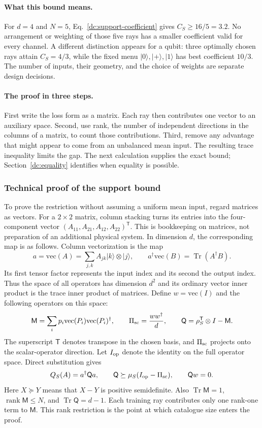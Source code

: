 \documentclass[11pt,a4paper]{article}
\newcommand{\ket}[1]{\lvert #1\rangle}
\newcommand{\Tr}{\operatorname{Tr}}
\numberwithin{equation}{section}
\begin{document}
\paragraph{What this bound means.}
For $d=4$ and $N=5$, Eq.~\eqref{dc:support-coefficient} gives $C_S\ge16/5=3.2$.
No arrangement or weighting of those five rays has a smaller coefficient
valid for every channel. A different distinction appears for a qubit:
three optimally chosen rays attain $C_S=4/3$, while the fixed menu
$\ket0,\ket+,\ket1$ has best coefficient $10/3$. The number of inputs,
their geometry, and the choice of weights are separate design decisions.

\paragraph{The proof in three steps.}
First write the loss form as a matrix. Each ray then contributes one vector
to an auxiliary space. Second, use rank, the number of independent directions
in the columns of a matrix, to count those contributions. Third, remove any
advantage that might appear to come from an unbalanced mean input. The
resulting trace inequality limits the gap. The next calculation supplies
the exact bound; Section~\ref{dc:equality} identifies when equality is possible.

\subsubsection*{Technical proof of the support bound}
To prove the restriction without assuming a uniform mean input, regard
matrices as vectors. For a $2\times2$ matrix, column stacking turns its
entries into the four-component vector
$(A_{11},A_{21},A_{12},A_{22})^{\mathsf T}$. This is bookkeeping on matrices,
not preparation of an additional physical system. In dimension $d$, the
corresponding map is as follows.  Column vectorization is the map
\[
 a=\mathrm{vec}(A)=\sum_{j,k}A_{jk}\ket{k}\otimes\ket{j},
 \qquad a^\dagger\mathrm{vec}(B)=\Tr(A^\dagger B).
\]
Its first tensor factor represents the input index and its second the output
index.  Thus the space of all operators has dimension $d^2$ and its ordinary
vector inner product is the trace inner product of matrices.  Define
$w=\mathrm{vec}(I)$ and the following operators on this space:
\[
 \mathsf M=\sum_i p_i\mathrm{vec}(P_i)\mathrm{vec}(P_i)^\dagger,
 \qquad
 \Pi_{\rm sc}=\frac{ww^\dagger}{d},
 \qquad
 \mathsf Q=\rho_S^{\mathsf T}\otimes I-\mathsf M.
\]
The superscript $\mathsf T$ denotes transpose in the chosen basis, and
$\Pi_{\rm sc}$ projects onto the scalar-operator direction.  Let $I_{\rm op}$
denote the identity on the full operator space.  Direct substitution gives
\begin{equation}
 Q_S(A)=a^\dagger\mathsf Q a,
 \qquad
 \mathsf Q\succeq\mu_S(I_{\rm op}-\Pi_{\rm sc}),
 \qquad \mathsf Qw=0.
 \label{dc:operator-gap}
\end{equation}
Here $X\succeq Y$ means that $X-Y$ is positive semidefinite.  Also
$\Tr\mathsf M=1$, $\operatorname{rank}\mathsf M\leq N$, and
$\Tr\mathsf Q=d-1$.  Each training ray contributes only one rank-one term to
$\mathsf M$.  This rank restriction is the point at which catalogue size
enters the proof.
\end{document}
